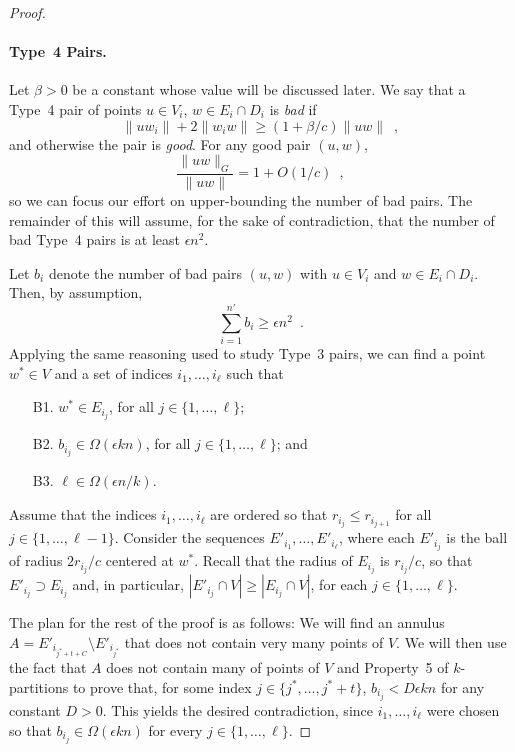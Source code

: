 \documentclass{patmorin}
\begin{document}
\begin{proof}
  \paragraph{Type~4 Pairs.}  
  Let $\beta > 0$ be a constant whose value will be discussed later.
  We say that a Type~4 pair of points $u\in V_i$, $w\in E_i\cap D_i$ is
  \emph{bad} if
  \[
      \|uw_i\|+2\|w_iw\| \ge (1+\beta/c)\|uw\| \enspace ,
  \]
  and otherwise the pair is \emph{good}.
  For any good pair $(u,w)$,
  \[
    \frac{\|uw\|_G}{\|uw\|} = 1+O(1/c) \enspace ,
  \]
  so we can focus our effort on upper-bounding the number of bad pairs.
  The remainder of this will assume, for the sake of contradiction,
  that the number of bad Type~4 pairs is at least $\epsilon n^2$.

  Let $b_i$ denote the number of bad pairs $(u,w)$ with $u\in V_i$
  and $w\in E_i\cap D_i$.  Then, by assumption,
  \[
    \sum_{i=1}^{n'} b_i \ge \epsilon n^2 \enspace .
  \]
  Applying the same reasoning used to study Type~3 pairs, we can find a
  point $w^*\in V$ and a set of indices $i_1,\ldots,i_{\ell}$ such that
  \begin{enumerate}\label{w-star}
    \item[B1.] $w^*\in E_{i_j}$, for all $j\in\{1,\ldots,\ell\}$;
    \item[B2.] $b_{i_j} \in \Omega(\epsilon kn)$, for all 
       $j\in\{1,\ldots,\ell\}$; and
    \item[B3.] $\ell\in \Omega(\epsilon n/k)$.
  \end{enumerate}

  Assume that the indices $i_1,\ldots,i_\ell$ are ordered so that
  $r_{i_j}\le r_{i_{j+1}}$ for all $j\in\{1,\ldots,\ell-1\}$.  Consider
  the sequences $E'_{i_1},\ldots,E'_{i_\ell}$, where each $E'_{i_j}$
  is the ball of radius $2r_{i_j}/c$ centered at $w^*$. Recall that the
  radius of $E_{i_j}$ is $r_{i_j}/c$, so that $E'_{i_j}\supset E_{i_j}$
  and, in particular, $|E'_{i_j}\cap V|\ge |E_{i_j}\cap V|$, for each
  $j\in\{1,\ldots,\ell\}$.

  The plan for the rest of the proof is as follows:  We will find an
  annulus $A=E'_{i_{j^*+t+C}}\setminus E'_{i_{j^*}}$ that does not contain
  very many points of $V$.  We will then use the fact that $A$ does not
  contain many of points of $V$ and Property~5 of $k$-partitions to prove
  that, for some index $j\in\{j^*,\ldots,j^*+t\}$, $b_{i_j}< D\epsilon kn$
  for any constant $D>0$.  This yields the desired contradiction, since
  $i_1,\ldots,i_\ell$ were chosen so that $b_{i_j}\in\Omega(\epsilon k n)$
  for every $j\in\{1,\ldots,\ell\}$.


\end{proof}
\end{document}
